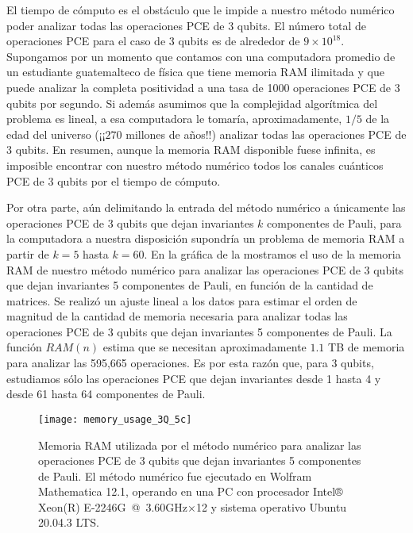 El tiempo de cómputo es el obstáculo que le impide a nuestro método numérico
poder analizar todas las operaciones PCE de 3 qubits. 
El número total de operaciones PCE para el caso 
de 3 qubits es de alrededor de $9\times10^{18}$. Supongamos por un momento
que contamos con una computadora promedio de un estudiante guatemalteco 
de física que tiene memoria RAM ilimitada y que puede analizar 
la completa positividad a una tasa de 1000 operaciones PCE de 
3 qubits por segundo. Si además asumimos que la complejidad 
algorítmica del problema es lineal, a esa computadora le tomaría, aproximadamente, 
$1/5$ de la edad del universo (¡¡$270$ millones de años!!) 
analizar todas las operaciones PCE de 3 qubits. En resumen, aunque 
la memoria RAM disponible fuese infinita, es imposible encontrar con 
nuestro método numérico todos los canales cuánticos PCE de 3 qubits
por el tiempo de cómputo. 

Por otra parte, aún delimitando la entrada del método numérico a 
únicamente las operaciones PCE de 3 qubits que dejan invariantes 
$k$ componentes de Pauli, para la computadora a nuestra disposición 
supondría un problema de memoria RAM a partir de $k=5$ hasta $k=60$.
En la gráfica de la  mostramos el uso de la 
memoria RAM de nuestro método numérico para analizar las operaciones 
PCE de 3 qubits que dejan invariantes 5 componentes de Pauli, 
en función de la cantidad de matrices. 
Se realizó un ajuste lineal a los datos para estimar 
el orden de magnitud de la cantidad de memoria necesaria para analizar todas 
las operaciones PCE de 3 qubits que dejan invariantes 5 componentes de Pauli.
La función $RAM(n)$ estima que se necesitan aproximadamente 
$1.1$ TB de memoria para analizar las 595,665 operaciones. 
Es por esta razón que, para 3 qubits, estudiamos sólo las operaciones PCE 
que dejan invariantes desde 1 hasta 4 y desde 61 hasta 64 
componentes de Pauli.
\begin{figure}
  \texttt{[image: memory\_usage\_3Q\_5c]}
  \caption{Memoria RAM utilizada por el método numérico para analizar las
  operaciones PCE de 3 qubits que dejan invariantes 5 componentes de Pauli.
  El método numérico fue ejecutado en Wolfram Mathematica 12.1, operando
  en una PC con procesador Intel® Xeon(R) E-2246G~@~3.60GHz×12 
  y sistema operativo Ubuntu 20.04.3 LTS. \ep}
  \label{fig:memory_usage_3Q_5c}
\end{figure}


